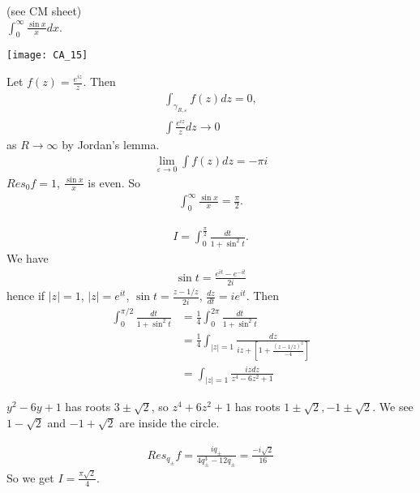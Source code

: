 \documentclass[a4paper]{article}
\begin{document}
\begin{eg} (see CM sheet)\\
$\int_0^\infty \frac{\sin x}{x} dx$.

\texttt{[image: CA\_15]}

Let $f(z) = \frac{e^{iz}}{z}$. Then
\begin{equation*}
\begin{aligned}
\int_{\gamma_{R,\varepsilon}} f(z) dz = 0,\\
\int \frac{e^{iz}}{z} dz \to 0
\end{aligned}
\end{equation*}
as $R \to \infty$ by Jordan's lemma.
\begin{equation*}
\begin{aligned}
\lim_{\varepsilon \to 0} \int f(z) dz = -\pi i
\end{aligned}
\end{equation*}
$Res_0 f=1$, $\frac{\sin x}{x}$ is even. So
\begin{equation*}
\begin{aligned}
\int_0^\infty \frac{\sin x}{x} = \frac{\pi}{2}.
\end{aligned}
\end{equation*}
\end{eg}

\begin{eg}
\begin{equation*}
\begin{aligned}
I = \int_0^{\frac{\pi}{2}} \frac{dt}{1+\sin^2 t}.
\end{aligned}
\end{equation*}
We have
\begin{equation*}
\begin{aligned}
\sin t = \frac{e^{it}-e^{-it}}{2i}
\end{aligned}
\end{equation*}
hence if $|z|=1$, $|z| = e^{it}$, $\sin t = \frac{z-1/z}{2i}$, $\frac{dz}{dt} = ie^{it}$. Then
\begin{equation*}
\begin{aligned}
\int_0^{\pi/2} \frac{dt}{1+\sin^2 t} &= \frac{1}{4} \int_0^{2\pi} \frac{dt}{1+\sin^2t}\\
&= \frac{1}{4} \int_{|z|=1} \frac{dz}{iz+\left[1+\frac{(z-1/z)^2}{-4}\right]}\\
&= \int_{|z|=1} \frac{iz dz}{z^4 - 6z^2 + 1} 
\end{aligned}
\end{equation*}

$y^2-6y+1$ has roots $3 \pm \sqrt{2}$, so $z^4 + 6z^2+1$ has roots $1\pm \sqrt{2},-1 \pm \sqrt{2}$. We see $1-\sqrt{2}$ and $-1+\sqrt{2}$ are inside the circle.

\begin{equation*}
\begin{aligned}
Res_{q_\pm} f = \frac{i q_\pm}{4q^3_\pm - 12q_\pm} = \frac{-i\sqrt{2}}{16}
\end{aligned}
\end{equation*}
So we get $I=\frac{\pi \sqrt{2}}{4}$.
\end{eg}
\end{document}
